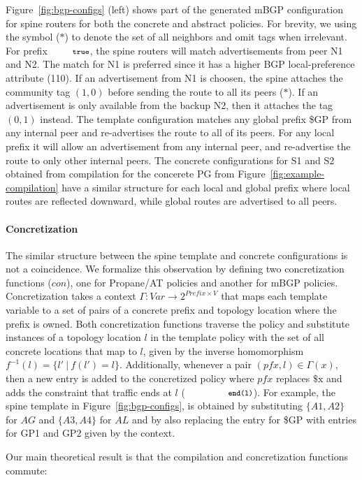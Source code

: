 \documentclass[numbers, 10pt]{sigplanconf}
\newcommand{\sysname}{{\text{}\small \sf Propane/AT}\xspace}
\newcommand{\mbgp}{{\small \sf mBGP}\xspace}
\newcommand{\para}[1]{\paragraph*{\textbf{#1}}}
\newcommand{\CD}[1]{\texttt{\small #1}}
\newcommand{\KW}[1]{\texttt{\small\bfseries{#1}}}
\newcommand{\True}{\CD{true}}
\newcommand{\End}{\KW{end}}
\begin{document}
Figure~\ref{fig:bgp-configs} (left) shows part of the generated \mbgp configuration for spine routers for both the concrete and abstract policies. For brevity, we using the symbol ($*$) to denote the set of all neighbors and omit tags when irrelevant.
%
For prefix $\True$, the spine routers will match advertisements from peer N1 and N2. The match for N1 is preferred since it has a higher BGP local-preference attribute (110). If an advertisement from N1 is choosen, the spine attaches the community tag $(1,0)$ before sending the route to all its peers ($*$). If an advertisement is only available from the backup N2, then it attaches the tag $(0,1)$ instead.
%
The template configuration matches any global prefix {\small \$GP} from any internal peer and re-advertises the route to all of its peers. For any local prefix it will allow an advertisement from any internal peer, and re-advertise the route to only other internal peers. The concrete configurations for S1 and S2 obtained from compilation for the concerete PG from Figure~\ref{fig:example-compilation} have a similar structure for each local and global prefix where local routes are reflected downward, while global routes are advertised to all peers.


\para{Concretization}
The similar structure between the spine template and concrete configurations is not a coincidence.  We formalize this observation by defining two concretization functions ($con$), one for \sysname policies and another for \mbgp policies. 
%
Concretization takes a context $\Gamma : \mathit{Var} \rightarrow 2^{\mathit{Prefix} \times V}$ that maps each template variable to a set of pairs of a concrete prefix and topology location where the prefix is owned.
%
Both concretization functions traverse the policy and substitute instances of a topology location $l$ in the template policy with the set of all concrete locations that map to $l$, given by the inverse homomorphism $f^{-1}(l) = \{l' ~\vert~ f(l') = l \}$. Additionally, whenever a pair $(pfx,l) \in \Gamma(x)$, then a new entry is added to the concretized policy where $pfx$ replaces $\$\mathrm{x}$ and adds the constraint that traffic ends at $l$ ($\CD{\End(l)}$).
%
For example, the spine template in Figure~\ref{fig:bgp-configs}, is obtained by substituting $\{ A1,A2 \}$ for $AG$ and $\{ A3,A4 \}$ for $AL$ and by also replacing the entry for {\small \$GP} with entries for {\small GP1} and {\small GP2} given by the context.

Our main theoretical result is that the compilation and concretization functions commute:
\end{document}

